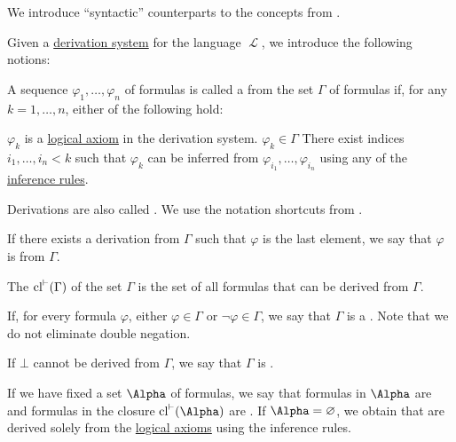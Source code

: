 \begin{definition}\label{def:first_order_proofs}
  We introduce \enquote{syntactic} counterparts to the concepts from .

  Given a \hyperref[def:first_order_derivation_system]{derivation system} for the language \( \mscrL \), we introduce the following notions:
  \begin{defenum}
    \mcite\cite[def. 12.1]{OpenLogic20201202}A sequence \( \varphi_1, \ldots, \varphi_n \) of formulas is called a  from the set \( \Gamma \) of formulas if, for any \( k = 1, \ldots, n \), either of the following hold:
    \begin{defenum}
       \( \varphi_k \) is a \hyperref[def:first_order_derivation_system/axioms]{logical axiom} in the derivation system.
       \( \varphi_k \in \Gamma \)
       There exist indices \( i_1, \ldots, i_n < k \) such that \( \varphi_k \) can be inferred from \( \varphi_{i_1}, \ldots, \varphi_{i_n} \) using any of the \hyperref[def:first_order_derivation_system/rules]{inference rules}.
    \end{defenum}

    Derivations are also called . We use the notation shortcuts from .

     If there exists a derivation from \( \Gamma \) such that \( \varphi \) is the last element, we say that \( \varphi \) is  from \( \Gamma \).

     The  \( \operatorname{cl}^{\vdash}(\Gamma) \) of the set \( \Gamma \) is the set of all formulas that can be derived from \( \Gamma \).

    \mcite\cite[def. 13.1]{OpenLogic20201202}If, for every formula \( \varphi \), either \( \varphi \in \Gamma \) or \( \neg \varphi \in \Gamma \), we say that \( \Gamma \) is a . Note that we do not eliminate double negation.

    \mcite\cite[def. 20.16]{OpenLogic20201202}If \( \bot \) cannot be derived from \( \Gamma \), we say that \( \Gamma \) is .

     If we have fixed a set \( \Alpha \) of formulas, we say that formulas in \( \Alpha \) are  and formulas in the closure \( \cl^{\vdash}(\Alpha) \) are . If \( \Alpha = \varnothing \), we obtain  that are derived solely from the \hyperref[def:first_order_derivation_system/axioms]{logical axioms} using the inference rules.
  \end{defenum}
\end{definition}

